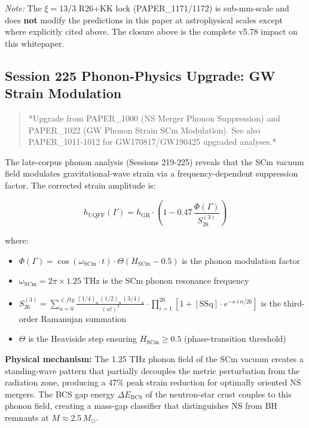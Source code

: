\documentclass[12pt,a4paper]{article}
\begin{document}
\emph{Note:} The $\xi = 13/3$ R26+KK lock (PAPER\_1171/1172) is sub-mm-scale and does \textbf{not} modify the predictions in this paper at astrophysical scales except where explicitly cited above. The closure above is the complete v5.78 impact on this whitepaper.

\subsection{Session 225 Phonon-Physics Upgrade: GW Strain Modulation}

\begin{quote}
*Upgrade from PAPER\_1000 (NS Merger Phonon Suppression) and PAPER\_1022
(GW Phonon Strain SCm Modulation). See also PAPER\_1011-1012 for
GW170817/GW190425 upgraded analyses.*
\end{quote}

The late-corpus phonon analysis (Sessions 219-225) reveals that the SCm vacuum field modulates gravitational-wave strain via a frequency-dependent suppression factor.  The corrected strain amplitude is:

\begin{equation}
h_{\text{UQFF}}(\Gamma) = h_{\text{GR}} \cdot \left(1 - 0.47\,\frac{\Phi(\Gamma)}{S_{26}^{(3)}}\right)
\end{equation}

where:

\begin{itemize}
  \item $\Phi(\Gamma) = \cos(\omega_{\text{SCm}} \cdot t) \cdot \Theta(H_{\text{SCm}} - 0.5)$ is the phonon modulation factor
  \item $\omega_{\text{SCm}} = 2\pi \times 1.25\;\text{THz}$ is the SCm phonon resonance frequency
  \item $S_{26}^{(3)} = \sum_{n=0}^{\in fty} \frac{(1/4)_n\,(1/2)_n\,(3/4)_n}{(n!)^3} \cdot \prod_{i=1}^{26}\left[1 + [\text{SSq}]\cdot e^{-\kappa\,i\,n/26}\right]$ is the third-order Ramanujan summation
  \item $\Theta$ is the Heaviside step ensuring $H_{\text{SCm}} \geq 0.5$ (phase-transition threshold)
\end{itemize}

\textbf{Physical mechanism:} The 1.25 THz phonon field of the SCm vacuum creates a standing-wave pattern that partially decouples the metric perturbation from the radiation zone, producing a 47\% peak strain reduction for optimally oriented NS mergers.  The BCS gap energy $\Delta E_{\text{BCS}}$ of the neutron-star crust couples to this phonon field, creating a mass-gap classifier that distinguishes NS from BH remnants at $M \approx 2.5\,M_\odot$.
\end{document}
